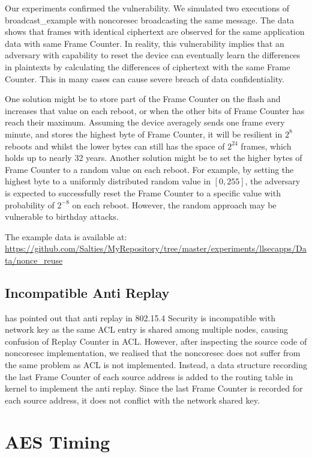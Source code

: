 Our experiments confirmed the vulnerability. We simulated two executions of  broadcast\_example with noncoresec broadcasting the same message. The data shows that frames with identical ciphertext are observed for the same application data with same Frame Counter. In reality, this vulnerability implies that an adversary with capability to reset the device can eventually learn the differences in plaintexts by calculating the differences of ciphertext with the same Frame Counter. This in many cases can cause severe breach of data confidentiality.

One solution might be to store part of the Frame Counter on the flash and increases that value on each reboot, or when the other bits of Frame Counter has reach their maximum. Assuming the device averagely sends one frame every minute, and stores the highest byte of Frame Counter, it will be resilient in $2^8$ reboots and whilst the lower bytes can still has the space of $2^{24}$ frames, which holds up to nearly 32 years. Another solution might be to set the higher bytes of Frame Counter to a random value on each reboot. For example, by setting the highest byte to a uniformly distributed random value in $[0,255]$, the adversary is expected to successfully reset the Frame Counter to a specific value with probability of $2^{-8}$ on each reboot. However, the random approach may be vulnerable to birthday attacks.

The example data is available at: \\
\url{https://github.com/Salties/MyRepository/tree/master/experiments/llsecapps/Data/nonce_reuse}

\subsection{ Incompatible Anti Replay}

\cite{802154sec} has pointed out that anti replay in 802.15.4 Security is incompatible with network key as the same ACL entry is shared among multiple nodes, causing confusion of Replay Counter in ACL. However, after inspecting the source code of noncoresec implementation, we realised that the noncoresec does not suffer from the same problem as ACL is not implemented. Instead, a data structure recording the last Frame Counter of each source address is added to the routing table in kernel to implement the anti replay. Since the last Frame Counter is recorded for each source address, it does not conflict with the network shared key.

\section{AES Timing} \label{Sec: AES Timing}

